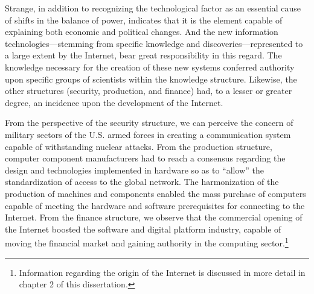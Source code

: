 Strange, in addition to recognizing the technological factor as an essential cause of shifts in the balance of power, indicates that it is the element capable of explaining both economic and political changes. And the new information technologies---stemming from specific knowledge and discoveries---represented to a large extent by the Internet, bear great responsibility in this regard. The knowledge necessary for the creation of these new systems conferred authority upon specific groups of scientists within the knowledge structure. Likewise, the other structures (security, production, and finance) had, to a lesser or greater degree, an incidence upon the development of the Internet.

From the perspective of the security structure, we can perceive the concern of military sectors of the U.S. armed forces in creating a communication system capable of withstanding nuclear attacks. From the production structure, computer component manufacturers had to reach a consensus regarding the design and technologies implemented in hardware so as to ``allow'' the standardization of access to the global network. The harmonization of the production of machines and components enabled the mass purchase of computers capable of meeting the hardware and software prerequisites for connecting to the Internet. From the finance structure, we observe that the commercial opening of the Internet boosted the software and digital platform industry, capable of moving the financial market and gaining authority in the computing sector.\footnote{Information regarding the origin of the Internet is discussed in more detail in chapter 2 of this dissertation.}

